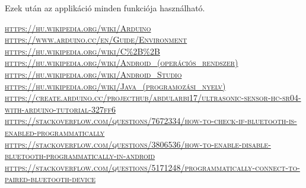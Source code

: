 \documentclass[]{thesis-ekf}
\theoremstyle{definition}
\begin{document}
Ezek után az applikáció minden funkciója használható.
\begin{thebibliography}{1}
	  \textsc{\url{https://hu.wikipedia.org/wiki/Arduino}}
	 \textsc{\url{https://www.arduino.cc/en/Guide/Environment}}
	\textsc{\url{https://hu.wikipedia.org/wiki/C\%2B\%2B}}
	\textsc{\url{https://hu.wikipedia.org/wiki/Android\_(operációs\_rendszer)}}
	\textsc{\url{https://hu.wikipedia.org/wiki/Android\_Studio}}
	\textsc{\url{https://hu.wikipedia.org/wiki/Java\_(programozási\_nyelv)}}
	\textsc{\url{https://create.arduino.cc/projecthub/abdularbi17/ultrasonic-sensor-hc-sr04-with-arduino-tutorial-327ff6}}
	\textsc{\url{https://stackoverflow.com/questions/7672334/how-to-check-if-bluetooth-is-enabled-programmatically}}
	\textsc{\url{https://stackoverflow.com/questions/3806536/how-to-enable-disable-bluetooth-programmatically-in-android}}
	\textsc{\url{https://stackoverflow.com/questions/5171248/programmatically-connect-to-paired-bluetooth-device}}
\end{thebibliography}
\end{document}
